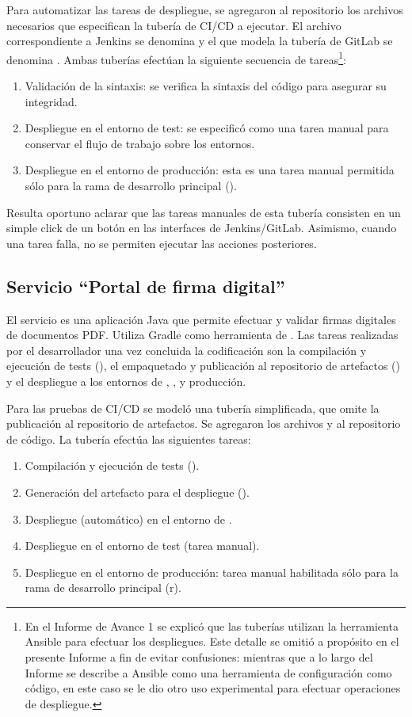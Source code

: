 Para automatizar las tareas de despliegue, se agregaron al repositorio
los archivos necesarios que especifican la tubería de CI/CD a
ejecutar. El archivo correspondiente a Jenkins se denomina
 y el que modela la tubería de GitLab se denomina
. Ambas tuberías efectúan la siguiente
secuencia de tareas\footnote{En el Informe de Avance 1 se explicó que
  las tuberías utilizan la herramienta Ansible para efectuar los
  despliegues. Este detalle se omitió a propósito en el presente
  Informe a fin de evitar confusiones: mientras que a lo largo del
  Informe se describe a Ansible como una herramienta de configuración
  como código, en este caso se le dio otro uso experimental para
  efectuar operaciones de despliegue.}:
%
\begin{enumerate}
\item Validación de la sintaxis: se verifica la sintaxis del código
  para asegurar su integridad.
\item Despliegue en el entorno de test: se especificó como una tarea
  manual para conservar el flujo de trabajo sobre los entornos.
\item Despliegue en el entorno de producción: esta es una tarea manual
  permitida sólo para la rama de desarrollo principal
  ().
\end{enumerate}
%
Resulta oportuno aclarar que las tareas manuales de esta tubería
consisten en un simple click de un botón en las interfaces de
Jenkins/GitLab. Asimismo, cuando una tarea falla, no se permiten
ejecutar las acciones posteriores.
%
\subsection{Servicio ``Portal de firma digital''}
%
El servicio es una aplicación Java que permite efectuar y validar
firmas digitales de documentos PDF. Utiliza Gradle como herramienta de
. Las tareas realizadas por el desarrollador una vez
concluida la codificación son la compilación y ejecución de tests
(), el empaquetado y publicación al repositorio
de artefactos () y el despliegue a los entornos
de , , y producción.

Para las pruebas de CI/CD se modeló una tubería simplificada, que
omite la publicación al repositorio de artefactos. Se agregaron los
archivos  y  al repositorio de
código. La tubería efectúa las siguientes tareas:
%
\begin{enumerate}
\item Compilación y ejecución de tests ().
\item Generación del artefacto para el despliegue ().
\item Despliegue (automático) en el entorno de .
\item Despliegue en el entorno de test (tarea manual).
\item Despliegue en el entorno de producción: tarea manual habilitada
  sólo para la rama de desarrollo principal (r).
\end{enumerate}
%
